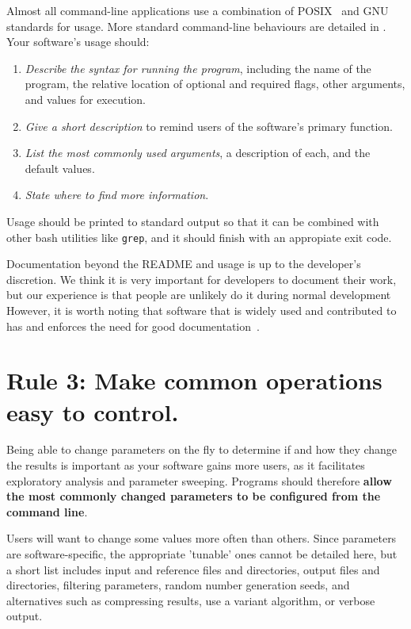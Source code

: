 \documentclass[10pt,letterpaper]{article}
\newcommand{\rulemajor}[1]{\section{#1}}
\newcommand{\ruleminor}[1]{\textbf{#1}}
\begin{document}
Almost all command-line applications use a combination of
POSIX~\cite{posix2016} and GNU~\cite{gnustandards} standards for
usage.  More standard command-line behaviours are detailed in
\cite{Seemann2013}.  Your software's usage should:

\begin{enumerate}

\item
  \textit{Describe the syntax for running the program}, including the
  name of the program, the relative location of optional and required
  flags, other arguments, and values for execution.

\item
  \textit{Give a short description} to remind users of the software's
  primary function.

\item
  \textit{List the most commonly used arguments}, a description of
  each, and the default values.

\item
  \textit{State where to find more information}.

\end{enumerate}

Usage should be printed to standard output so that it can be combined
with other bash utilities like \texttt{grep}, and it should finish
with an appropiate exit code.

Documentation beyond the README and usage is up to the developer's
discretion.  We think it is very important for developers to document
their work, but our experience is that people are unlikely do it
during normal development However, it is worth noting that software
that is widely used and contributed to has and enforces the need for
good documentation~\cite{gentleman2004}.

\rulemajor{Rule 3: Make common operations easy to control.}

Being able to change parameters on the fly to determine if and how
they change the results is important as your software gains more
users, as it facilitates exploratory analysis and parameter sweeping.
Programs should therefore \ruleminor{allow the most commonly changed
parameters to be configured from the command line}.

Users will want to change some values more often than others.  Since
parameters are software-specific, the appropriate 'tunable' ones
cannot be detailed here, but a short list includes input and reference
files and directories, output files and directories, filtering
parameters, random number generation seeds, and alternatives such as
compressing results, use a variant algorithm, or verbose output.
\end{document}
